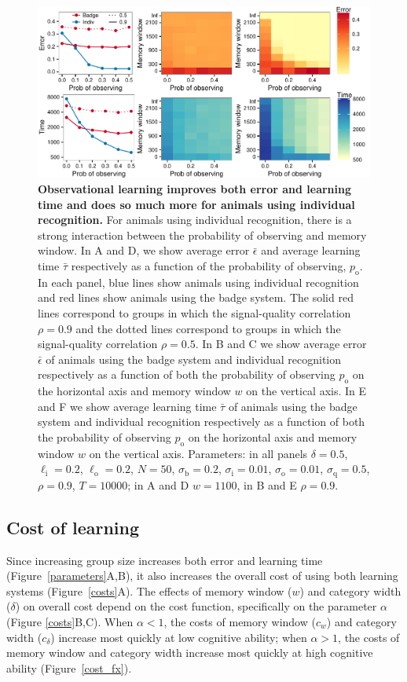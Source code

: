 \begin{figure}
\includegraphics[width=6.85in]{figures/observational_learning.pdf}
\caption{\sffamily\small\textbf{Observational learning improves both error and learning time and does so much more for animals using individual recognition.} For animals using individual recognition, there is a strong interaction between the probability of observing and memory window. In A and D, we show average error $\bar{\epsilon}$ and average learning time $\bar{\tau}$ respectively as a function of the probability of observing, $p_\text{o}$. In each panel, blue lines show animals using individual recognition and red lines show animals using the badge system. The solid red lines correspond to groups in which the signal-quality correlation $\rho=0.9$ and the dotted lines correspond to groups in which the signal-quality correlation $\rho=0.5$. In B and C we show average error $\bar{\epsilon}$ of animals using the badge system and individual recognition respectively as a function of both the probability of observing $p_\text{o}$ on the horizontal axis and memory window $w$ on the vertical axis. In E and F we show average learning time $\bar{\tau}$ of animals using the badge system and individual recognition respectively as a function of both the probability of observing $p_\text{o}$ on the horizontal axis and memory window $w$ on the vertical axis.  Parameters: in all panels $\delta = 0.5$, $\ell_\text{i}=0.2$, $\ell_\text{o}=0.2$, $N=50$, $\sigma_\text{b}=0.2$, $\sigma_\text{i}=0.01$, $\sigma_\text{o}=0.01$, $\sigma_\text{q}=0.5$, $\rho=0.9$, $T=10000$; in A and D $w=1100$, in B and E $\rho=0.9$.}
\label{observational}
\end{figure}

%
\subsection*{Cost of learning}
% 
Since increasing group size increases both error and learning time (Figure~\ref{parameters}A,B), it also increases the overall cost of using both learning systems (Figure~\ref{costs}A). The effects of memory window ($w$) and category width ($\delta$) on overall cost depend on the cost function, specifically on the parameter $\alpha$ (Figure \ref{costs}B,C). When $\alpha<1$, the costs of memory window ($c_w$) and category width ($c_\delta$) increase most quickly at low cognitive ability; when $\alpha>1$, the costs of memory window and category width increase most quickly at high cognitive ability (Figure~\ref{cost_fx}). 

